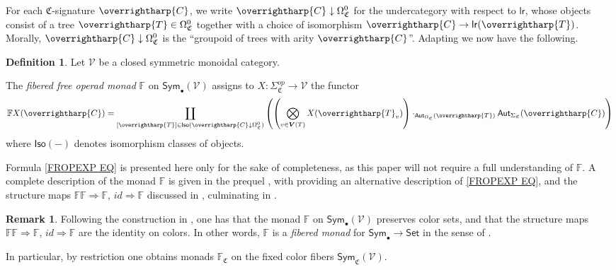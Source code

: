 \documentclass[a4paper,10pt
 ,final
]{article}%
\numberwithin{equation}{section}
\numberwithin{figure}{section}
\theoremstyle{definition} %
\newtheorem{definition}[equation]{Definition}%
\newtheorem{remark}[equation]{Remark}%
\newcommand{\vect}[1]{\text{\overrightharp{\ensuremath{#1}}}}
\newcommand{\V}{\ensuremath{\mathcal V}}
\newcommand{\1}{\ensuremath{\mathbbm 1}}%
\begin{document}
For each $\mathfrak{C}$-signature $\vect{C}$,
we write $\vect{C} \downarrow \Omega_{\mathfrak{C}}^0$
for the undercategory with respect to $\mathsf{lr}$, 
whose objects consist of a tree $\vect{T}\in \Omega_{\mathfrak{C}}^0$
together with a choice of isomorphism 
$\vect{C} \to \mathsf{lr}(\vect{T})$.
Morally, $\vect{C} \downarrow \Omega_{\mathfrak{C}}^0$
is the ``groupoid of trees with arity $\vect{C}$''.
Adapting \cite[page 816]{BM07} we now have the following.





\begin{definition}\label{FREEOP DEF}
	Let $\mathcal{V}$ be a closed symmetric monoidal category.
	
	The \textit{fibered free operad monad} $\mathbb{F}$ on $\mathsf{Sym}_\bullet(\mathcal{V})$ 
	assigns to 
	$X \colon \Sigma_{\mathfrak{C}}^{op} \to \mathcal{V}$
	the functor
\begin{equation}\label{FROPEXP EQ}
\mathbb{F} X (\vect{C})
=
\coprod_{[\vect{T}] \in 
	\mathsf{Iso}(\vect{C} \downarrow \Omega^0_{\mathfrak{C}})}
\left(
\left(
\bigotimes_{v \in \boldsymbol{V}(T)} X(\vect{T}_v)
\right)
\cdot_{\mathsf{Aut}_{\Omega_{\mathfrak{C}}}(\vect{T})}
\mathsf{Aut}_{\Sigma_{\mathfrak{C}}}(\vect{C})
\right)
\end{equation}
where $\mathsf{Iso}(-)$ denotes isomorphism classes of objects.
\end{definition}


Formula \eqref{FROPEXP EQ}
is presented here only for the sake of completeness,
as this paper will not require a full understanding of 
$\mathbb{F}$.
A complete description of the monad 
$\mathbb{F}$
is given in the prequel \cite{BP_FCOP},
with \cite[Def. \ref{OC-FREEOP DEF}]{BP_FCOP}
providing an alternative description of
\eqref{FROPEXP EQ},
and the structure maps
$\mathbb{F}\mathbb{F} \Rightarrow \mathbb{F}$,
$id \Rightarrow \mathbb{F}$ 
discussed in \cite[App. \ref{OC-MONAD_APDX}]{BP_FCOP},
culminating in \cite[Def. \ref{OC-COLORMON_DEF}]{BP_FCOP}.




\begin{remark}\label{FIBMON REM}
	Following the construction in \cite[Def. \ref{OC-COLORMON_DEF}]{BP_FCOP},
	one has that the monad $\mathbb{F}$
	on $\mathsf{Sym}_{\bullet}(\V)$
	preserves color sets,
	and that the structure maps
	$\mathbb{F}\mathbb{F} \Rightarrow \mathbb{F}$,
	$id \Rightarrow \mathbb{F}$
	are the identity on colors.
	In other words,
	$\mathbb{F}$ is a \emph{fibered monad} for
	$\mathsf{Sym}_{\bullet} \to \mathsf{Set}$
	in the sense of 
	\cite[Def. \ref{OC-FIBMON DEF}]{BP_FCOP}.
	
	In particular, 
	by restriction one obtains monads
	$\mathbb{F}_{\mathfrak{C}}$
	on the fixed color fibers 
	$\mathsf{Sym}_{\mathfrak{C}}(\V)$.
\end{remark}
\end{document}
